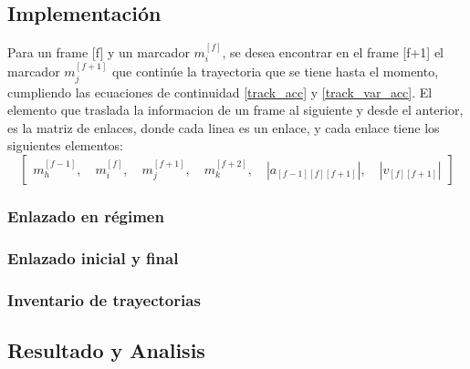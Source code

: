 \subsection{Implementación}

Para un frame [f] y un marcador $m_{i}^{[f]}$, se desea encontrar en el frame [f+1] el marcador $m_{j}^{[f+1]}$ que continúe la trayectoria que se tiene hasta el momento, cumpliendo las ecuaciones de continuidad \ref{track_acc} y \ref{track_var_acc}. El elemento que traslada la informacion de un frame al siguiente y desde el anterior, es la matriz de enlaces, donde cada linea es un enlace, y cada enlace tiene los siguientes elementos:
\begin{equation}
\begin{bmatrix}
  m_{h}^{[f-1]} ,\quad m_{i}^{[f]} ,\quad m_{j}^{[f+1]} ,\quad m_{k}^{[f+2]} ,\quad \left|a_{[f-1][f][f+1]}\right| ,\quad \left|v_{[f][f+1]}\right|
\end{bmatrix}
\end{equation}

\subsubsection{Enlazado en régimen}



\subsubsection{Enlazado inicial y final}



\subsubsection{Inventario de trayectorias}



\subsection{Resultado y Analisis}


